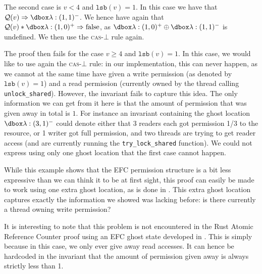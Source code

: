 The second case is $v < 4$ and $\texttt{lsb}(v) = 1$. In this case we have that $\mathcal{Q}(v) \Rightarrow \efcm{1}{1}$. We hence have again that  $\mathcal{Q}(v) * \efcp{1}{0} \Rightarrow \text{false}$, as $\efcp{1}{0} \oplus \efcm{1}{1}$ is undefined. We then use the \textsc{cas}-$\bot$ rule again.

The proof then fails for the case $v \ge 4$ and $\texttt{lsb}(v) = 1$. In this case, we would like to use again the \textsc{cas}-$\bot$ rule: in our implementation, this can never happen, as we cannot at the same time have given a write permission (as denoted by $\texttt{lsb}(v) = 1$) and a read permission (currently owned by the thread calling \texttt{unlock\_shared}). However, the invariant fails to capture this idea. The only information we can get from it here is that the amount of permission that was given away in total is $1$. For instance an invariant containing the ghost location $\ghost{\lambda:(3, 1)^-}$ could denote either that 3 readers each got permission 1/3 to the resource, or 1 writer got full permission, and two threads are trying to get reader access (and are currently running the \texttt{try\_lock\_shared} function). We could not express using only one ghost location that the first case cannot happen.

While this example shows that the EFC permission structure is a bit less expressive than we can think it to be at first sight, this proof can easily be made to work using one extra ghost location, as is done in \cite{gaurav}. This extra ghost location captures exactly the information we showed was lacking before: is there currently a thread owning write permission?

It is interesting to note that this problem is not encountered in the Rust Atomic Reference Counter proof using an EFC ghost state developed in \cite{gaurav}. This is simply because in this case, we only ever give away read accesses. It can hence be hardcoded in the invariant that the amount of permission given away is always strictly less than 1.


